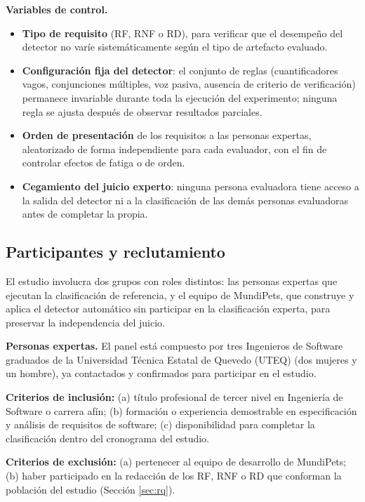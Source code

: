 \documentclass[journal,onecolumn]{IEEEtran}
\begin{document}
	\textbf{Variables de control.}
	\begin{itemize}[leftmargin=*]
		\item \textbf{Tipo de requisito} (RF, RNF o RD), para verificar que el
		desempeño del detector no varíe sistemáticamente según el tipo de
		artefacto evaluado.
		\item \textbf{Configuración fija del detector}: el conjunto de reglas
		(cuantificadores vagos, conjunciones múltiples, voz pasiva, ausencia de
		criterio de verificación) permanece invariable durante toda la
		ejecución del experimento; ninguna regla se ajusta después de observar
		resultados parciales.
		\item \textbf{Orden de presentación} de los requisitos a las personas
		expertas, aleatorizado de forma independiente para cada evaluador, con
		el fin de controlar efectos de fatiga o de orden.
		\item \textbf{Cegamiento del juicio experto}: ninguna persona
		evaluadora tiene acceso a la salida del detector ni a la clasificación
		de las demás personas evaluadoras antes de completar la propia.
	\end{itemize}
	
	\subsection{Participantes y reclutamiento}
	\label{sec:participantes}
	
	El estudio involucra dos grupos con roles distintos: las personas expertas
	que ejecutan la clasificación de referencia, y el equipo de MundiPets, que
	construye y aplica el detector automático sin participar en la
	clasificación experta, para preservar la independencia del juicio.
	
	\textbf{Personas expertas.} El panel está compuesto por tres Ingenieros de
	Software graduados de la Universidad Técnica Estatal de Quevedo (UTEQ) (dos
	mujeres y un hombre), ya contactados y confirmados para participar en el
	estudio.
	
	\textbf{Criterios de inclusión:} (a) título profesional de tercer nivel en
	Ingeniería de Software o carrera afín; (b) formación o experiencia
	demostrable en especificación y análisis de requisitos de software; (c)
	disponibilidad para completar la clasificación dentro del cronograma del
	estudio.
	
	\textbf{Criterios de exclusión:} (a) pertenecer al equipo de desarrollo de
	MundiPets; (b) haber participado en la redacción de los RF, RNF o RD que
	conforman la población del estudio (Sección \ref{sec:rq}).
	
\end{document}
